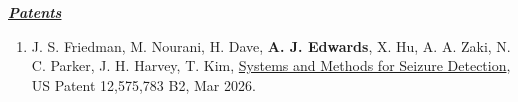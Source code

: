 \documentclass[12pt]{article}
\begin{document}
\begin{enumerate}

\end{enumerate}

{\large \textit{\textbf{\ul{Patents}}}}

\begin{enumerate}
\item J. S. Friedman, M. Nourani, H. Dave, \textbf{A. J. Edwards}, X. Hu, A. A. Zaki, N. C. Parker, J. H. Harvey, T. Kim, \ul{Systems and Methods for Seizure Detection}, US Patent 12,575,783 B2, Mar 2026.

\end{enumerate}
\end{document}

